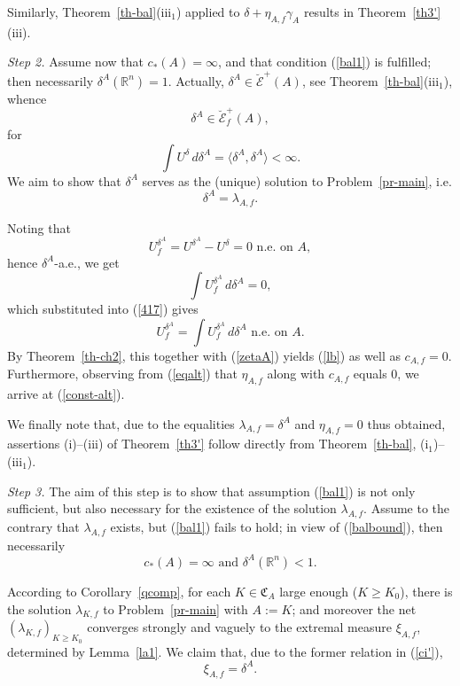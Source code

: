 \documentclass[12pt,a4paper,reqno]{amsart} %
\theoremstyle{lause}
\theoremstyle{maaritelma}
\theoremstyle{lause}
\theoremstyle{maaritelma}
\numberwithin{equation}{section}
\begin{document}
Similarly, Theorem~\ref{th-bal}(iii$_1$) applied to $\delta+\eta_{A,f}\gamma_A$ results in Theorem~\ref{th3'}(iii).\smallskip

{\it Step 2.} Assume now that $c_*(A)=\infty$, and that condition (\ref{bal1}) is fulfilled; then necessarily $\delta^A(\mathbb R^n)=1$. Actually, $\delta^A\in\breve{\mathcal E}^+(A)$, see Theorem~\ref{th-bal}(iii$_1$), whence
\begin{equation}\label{zetaA}
\delta^A\in\breve{\mathcal E}^+_f(A),
\end{equation}
for
\[\int U^\delta\,d\delta^A=\langle\delta^A,\delta^A\rangle<\infty.\]
We aim to show that $\delta^A$ serves as the (unique) solution to Problem~\ref{pr-main}, i.e.
\begin{equation}\label{lb}
\delta^A=\lambda_{A,f}.
\end{equation}

Noting that
\begin{equation}\label{417}
U_f^{\delta^A}=U^{\delta^A}-U^\delta=0\text{ \ n.e.\ on $A$},
\end{equation}
hence $\delta^A$-a.e., we get
\[\int U_f^{\delta^A}\,d\delta^A=0,\]
which substituted into (\ref{417}) gives
\[U_f^{\delta^A}=\int U_f^{\delta^A}\,d\delta^A\text{ \ n.e.\ on $A$}.\]
By Theorem~\ref{th-ch2}, this together with (\ref{zetaA}) yields (\ref{lb}) as well as $c_{A,f}=0$. Furthermore, observing from (\ref{eqalt}) that $\eta_{A,f}$ along with $c_{A,f}$ equals $0$, we arrive at (\ref{const-alt}).

We finally note that, due to the equalities $\lambda_{A,f}=\delta^A$ and $\eta_{A,f}=0$ thus obtained, assertions (i)--(iii) of Theorem~\ref{th3'} follow directly from Theorem~\ref{th-bal}, (i$_1$)--(iii$_1$).\smallskip

{\it Step 3.} The aim of this step is to show that assumption (\ref{bal1}) is not only sufficient, but also necessary for the existence of the solution $\lambda_{A,f}$. Assume to the contrary that $\lambda_{A,f}$ exists, but (\ref{bal1}) fails to hold; in view of (\ref{balbound}), then necessarily
\begin{equation}\label{ci'}
 c_*(A)=\infty\text{ \ and \ }\delta^A(\mathbb R^n)<1.
\end{equation}

According to Corollary~\ref{qcomp}, for each $K\in\mathfrak C_A$ large enough ($K\geqslant K_0$), there is the solution $\lambda_{K,f}$ to Problem~\ref{pr-main} with $A:=K$; and moreover the net $(\lambda_{K,f})_{K\geqslant K_0}$ converges strongly and vaguely to the extremal measure $\xi_{A,f}$, determined by Lemma~\ref{la1}. We claim that, due to the former relation in (\ref{ci'}),
\begin{equation}\label{eqq}
 \xi_{A,f}=\delta^A.
\end{equation}
\end{document}
